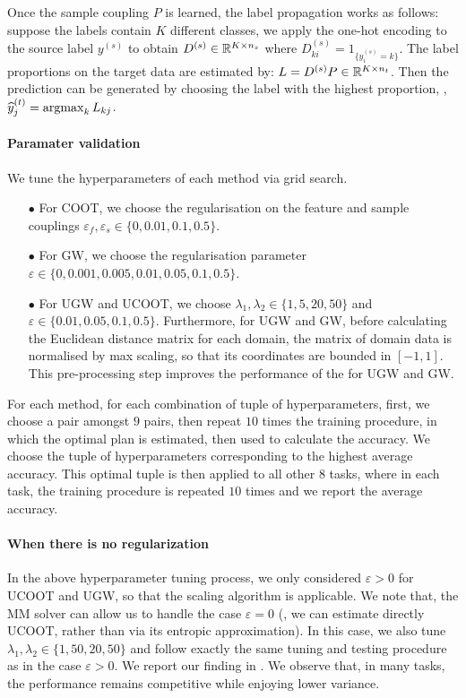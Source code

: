 Once the sample coupling $P$ is learned, the label propagation works as follows:
suppose the labels contain $K$ different classes,
we apply the one-hot encoding to the source label $y^{(s)}$ to obtain
$D^{(s)} \in \mathbb R^{K \times n_s}$ where $D^{(s)}_{ki} = 1_{\{y^{(s)}_i = k\}}$.
The label proportions on the target data are
estimated by: $L = D^{(s)} P \in \mathbb R^{K \times n_t}$. Then the prediction can be generated
by choosing the label with the highest proportion, \ie, $\widehat{y}^{(t)}_j = \operatorname*{argmax}_k L_{kj}$.

\paragraph{Paramater validation}

We tune the hyperparameters of each method via grid search.
\begin{itemize}
  \item[$\bullet$] For COOT, we choose the regularisation on the feature and sample couplings
  $\varepsilon_f, \varepsilon_s \in \{0, 0.01, 0.1, 0.5\}$.
  \item[$\bullet$] For GW, we choose the regularisation parameter
  $\varepsilon \in \{0, 0.001, 0.005, 0.01, 0.05, 0.1, 0.5\}$.
  \item[$\bullet$] For UGW and UCOOT, we choose $\lambda_1, \lambda_2 \in \{1, 5, 20, 50\}$ and
  $\varepsilon \in \{0.01, 0.05, 0.1, 0.5\}$.
  Furthermore, for UGW and GW, before calculating the Euclidean distance matrix for each domain,
  the matrix of domain data is normalised by max scaling, so that its coordinates are bounded in
  $[-1,1]$. This pre-processing step improves the performance of the for UGW and GW.
\end{itemize}
For each method, for each combination of tuple of hyperparameters, first, we choose a pair
amongst $9$ pairs, then repeat $10$ times the training procedure, in which the optimal plan
is estimated, then used to calculate the accuracy. We choose the tuple of hyperparameters
corresponding to the highest average accuracy. This optimal tuple is then applied to
all other $8$ tasks, where in each task, the training procedure is repeated $10$ times and
we report the average accuracy.

\paragraph{When there is no regularization} In the above hyperparameter tuning process,
we only considered $\varepsilon > 0$ for UCOOT and UGW, so that the scaling algorithm
\citep{Chizat18b} is applicable. We note that,
the MM solver can allow us to handle the case $\varepsilon = 0$
(\ie, we can estimate directly UCOOT, rather than via its entropic approximation).
In this case, we also tune $\lambda_1, \lambda_2 \in \{ 1, 50, 20, 50\}$ and
follow exactly the same tuning and testing procedure as in the case $\varepsilon > 0$.
We report our finding in . We observe that, in many tasks,
the performance remains competitive while enjoying lower variance.

